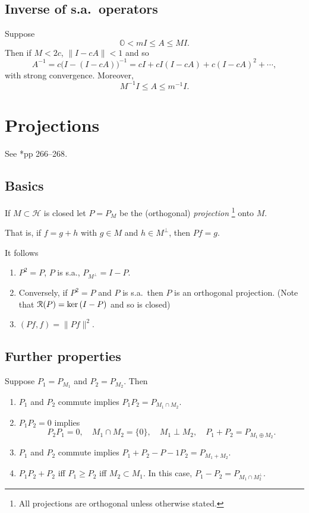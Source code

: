 \documentclass[a4paper]{amsart}
\theoremstyle{plain}
\theoremstyle{definition}
\theoremstyle{remark}
\begin{document}
\subsection{Inverse of s.a.\ operators}
Suppose 
\[
\mathbb{O} < m I \leq A \leq MI .
\]
Then if $ M < 2c $, $ \| I - cA \| < 1 $ and so
\[
A^{-1} = c \big(I-(I-cA)\big)^{-1} = cI + cI(I-cA) + c (I-cA)^2 +\cdots , \]
with strong convergence.  Moreover,
\[
M^{-1}I \leq A \leq m^{-1}I .
\]


\section{\textbf{Projections}}  See \cite{RN}*{pp 266--268}.

\subsection{Basics}
If $ M \subset \mathcal{H} $ is closed let $ P = P_M $ be the  (orthogonal) \emph{projection}%
\footnote{All projections are orthogonal unless otherwise stated.} onto $ M $.

That is, if $ f = g + h $ with $ g \in M $ and $ h \in  M^\perp $, then $ Pf = g $.

\medskip
It follows
\begin{enumerate}

\item $ P^2 = P $, $ P $ is s.a., $ P_{M^\perp} = I - P $.
\item Conversely, if $ P ^2 = P $ and $ P $ is s.a.\  then $ P $ is an orthogonal projection.  (Note that $ \mathcal{R} (P) = \text{ker\,} (I-P) $ and so is closed)
\item $ (Pf,f) = \| Pf\|^2 $.
\end{enumerate}

\subsection{Further properties}
Suppose $ P_1 = P_{M_1} $ and $ P_2 = P_{M_2} $.  Then
\begin{enumerate}

\item $ P_1$ and $  P_2  $ commute implies $ P_1 P_2 = P_{M_1 \cap M_2 } $.
\item $ P_1 P_2 = 0 $ implies
\[
P_2 P_1 = 0, \quad M_1 \cap M_2 = \{0\}, \quad M_1 \perp M_2, \quad P_1 + P_2 = P_{M_1 \oplus M_2}.
\]
\item $ P_1 $ and $ P_2 $ commute implies $ P_1 +P_2 - P-1 P_2 = P_{M_1 + M_2 } $.
\item $ P_1 P_2 + P_2 $ iff $ P_1 \geq P_2 $ iff $ M_2 \subset M_1 $.
In this case, $ P_1 - P_2 = P_{M_1 \cap M_2^\perp} $.
\end{enumerate} 
 
\end{document}
